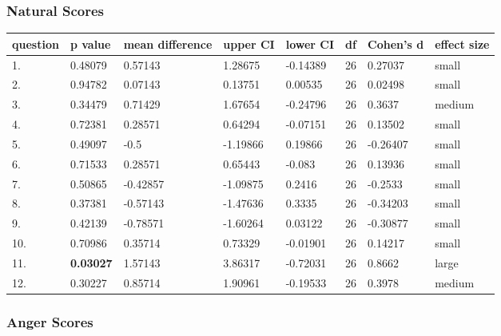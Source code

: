 \documentclass[11pt, twoside, reqno]{book}
\begin{document}
\subsubsection{\textbf{Natural Scores}}

\begin{tabular}{|l|l|l|l|l|l|l|l|}
\hline
    question & p value & mean difference & upper CI & lower CI & df & Cohen's d & effect size \\ \hline
    1. & 0.48079 & 0.57143 & 1.28675 & -0.14389 & 26 & 0.27037 & small \\ \hline
    2. & 0.94782 & 0.07143 & 0.13751 & 0.00535 & 26 & 0.02498 & small \\ \hline
    3. & 0.34479 & 0.71429 & 1.67654 & -0.24796 & 26 & 0.3637 & medium  \\ \hline
    4. & 0.72381 & 0.28571 & 0.64294 & -0.07151 & 26 & 0.13502 & small \\ \hline
    5. & 0.49097 & -0.5 & -1.19866 & 0.19866 & 26 & -0.26407 & small  \\ \hline
    6. & 0.71533 & 0.28571 & 0.65443 & -0.083 & 26 & 0.13936 & small \\ \hline
    7. & 0.50865 & -0.42857 & -1.09875 & 0.2416 & 26 & -0.2533 & small \\ \hline
    8. & 0.37381 & -0.57143 & -1.47636 & 0.3335 & 26 & -0.34203 & small \\ \hline
    9. & 0.42139 & -0.78571 & -1.60264 & 0.03122 & 26 & -0.30877 & small \\ \hline
    10. & 0.70986 & 0.35714 & 0.73329 & -0.01901 & 26 & 0.14217 & small \\ \hline
    11. & \textbf{0.03027} & 1.57143 & 3.86317 & -0.72031 & 26 & 0.8662 & large \\ \hline
    12. & 0.30227 & 0.85714 & 1.90961 & -0.19533 & 26 & 0.3978 & medium \\ \hline
\end{tabular}
\vspace{16pt}

\subsubsection{\textbf{Anger Scores}}
\end{document}
